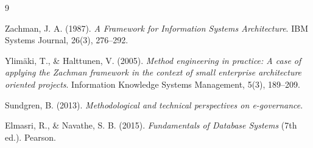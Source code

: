 \documentclass[12pt,a4paper]{article}
\begin{document}
\begingroup
\small
\setlength{\itemsep}{0pt}
\begin{thebibliography}{9}

Zachman, J. A. (1987).
\emph{A Framework for Information Systems Architecture}.
IBM Systems Journal, 26(3), 276--292.

Ylimäki, T., \& Halttunen, V. (2005).
\emph{Method engineering in practice: A case of applying the Zachman framework in the context of small enterprise architecture oriented projects}.
Information Knowledge Systems Management, 5(3), 189--209.

Sundgren, B. (2013).
\emph{Methodological and technical perspectives on e-governance}.

Elmasri, R., \& Navathe, S. B. (2015).
\emph{Fundamentals of Database Systems} (7th ed.).
Pearson.

\end{thebibliography}
\endgroup
\end{document}
